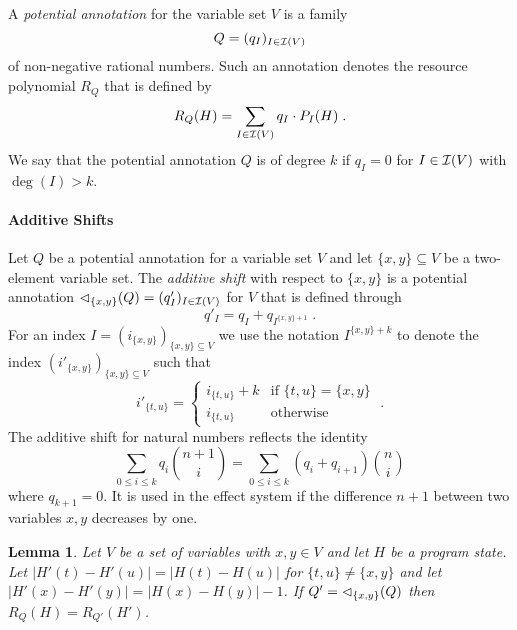 \documentclass[nocopyrightspace,preprint]{sigplanconf-pldi15}
\newtheorem{lemma}{Lemma}
\begin{document}
A \emph{potential annotation} for the variable set $V$ is a family
$$Q = (q_I)_{I \in \mathcal{I}(V)}$$
of non-negative rational numbers.  Such an annotation denotes the
resource polynomial $R_Q$ that is defined by
$$
R_Q(H) = \sum_{I \in \mathcal{I}(V)} q_I \cdot P_I(H) \; .
$$
%
We say that the potential annotation $Q$ is of degree $k$ if $q_I = 0$
for $I \in \mathcal{I}(V)$ with $\deg(I) > k$.

\paragraph{Additive Shifts}

Let $Q$ be a potential annotation for a variable set $V$ and let
$\{x,y\} \subseteq V$ be a two-element variable set.  The
\emph{additive shift} with respect to $\{x,y\}$ is a potential
annotation ${\lhd}_{\{x,y\}}(Q) = (q'_I)_{I \in \mathcal{I}(V)} $ for $V$
that is defined through
$$
q'_I = q_I + q_{I^{\{x,y\}{+}1}} \; .
$$
For an index $I = (i_{\{x,y\}})_{\{x,y\} \subseteq V}$ we use the
notation $I^{\{x,y\}{+}k}$ to denote the index
$(i'_{\{x,y\}})_{\{x,y\} \subseteq V}$ such that
$$
i'_{\{t,u\}} = \left\{
  \begin{array}{ll}
    i_{\{t,u\}} + k  & \text{if } \{t,u\} = \{x,y\} \\
    i_{\{t,u\}} & \text{otherwise}
  \end{array}
\right.
\;.
$$
%
The additive shift for natural numbers reflects the identity
\begin{equation}
\label{eq:shift}
\sum_{0 {\leq} i \leq {k}} q_i \binom{n+1}{i} = \sum_{0 {\leq} i \leq {k}} (q_i{+}q_{i+1}) \binom{n}{i}
\end{equation}
where $q_{k+1} = 0$.  It is used in the effect system if the
difference $n+1$ between two variables $x,y$ decreases by one.

\begin{lemma} Let $V$ be a set of variables with $x,y \in V$ and let
  $H$ be a program state. Let $|H'(t) {-} H'(u)| = |H(t) {-} H(u)|$
  for $\{t,u\} \neq \{x,y\}$ and let $|H'(x) {-} H'(y)| = |H(x) {-}
  H(y)| - 1$.
  If $Q' = {\lhd}_{\{x,y\}}(Q)$ then $R_Q(H) = R_{Q'}(H')$.
\end{lemma}
\end{document}
